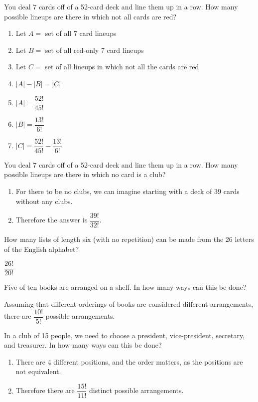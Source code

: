 \documentclass[openany, 12pt]{book}
\begin{document}
\begin{exercise}{}{}
	You deal 7 cards off of a 52-card deck and line them up in
	a row. How many possible lineups are there in which not all cards are red?
	\begin{enumerate}[label={\textbullet}, leftmargin=*, itemsep=0pt, parsep=0pt]
		\item Let $A=$ set of all 7 card lineups
		\item Let $B=$ set of all red-only 7 card lineups
		\item Let $C=$ set of all lineups in which not all the cards are red
		\item $|A| - |B| = |C|$
		\item $|A|=\dfrac{52!}{45!}$
		\item $|B|=\dfrac{13!}{6!}$
		\item $|C|=\dfrac{52!}{45!} - \dfrac{13!}{6!}$
	\end{enumerate}
\end{exercise}

\begin{exercise}{}{}
	You deal 7 cards off of a 52-card deck and line them up in
	a row. How many possible lineups are there in which no card is a club?
	\begin{enumerate}[label={\textbullet}, leftmargin=*, itemsep=0pt, parsep=0pt]
		\item For there to be no clubs, we can imagine starting with a deck of 39
		      cards without any clubs.
		\item Therefore the answer is $\dfrac{39!}{32!}$.
	\end{enumerate}
\end{exercise}

\begin{exercise}{}{}
	How many lists of length six (with no repetition) can be
	made from the 26 letters of the English alphabet?

	$\dfrac{26!}{20!}$
\end{exercise}

\begin{exercise}{}{}
	Five of ten books are arranged on a shelf. In how many ways can this be done?

	Assuming that different orderings of books are considered different
	arrangements, there are $\dfrac{10!}{5!}$ possible arrangements.
\end{exercise}

\begin{exercise}{}{}
	In a club of 15 people, we need to choose a president,
	vice-president, secretary, and treasurer. In how many ways can this be done?
	\begin{enumerate}[label={\textbullet}, leftmargin=*, itemsep=0pt, parsep=0pt]
		\item There are 4 different positions, and the order matters, as the positions
		      are not equivalent.
		\item Therefore there are $\dfrac{15!}{11!}$ distinct possible
		      arrangements.
	\end{enumerate}
\end{exercise}
\end{document}
